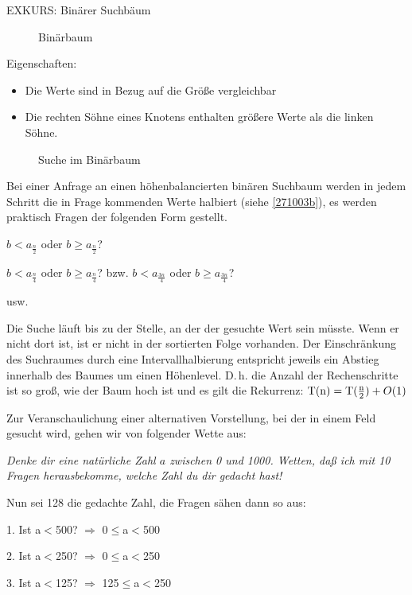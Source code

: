 \documentclass[ngerman,draft,parskip=half*,twoside]{scrreprt}
\theoremstyle{break}
\begin{document}
EXKURS: Binärer Suchbäum
\begin{figure}[H]
	\centering
	\caption{Binärbaum}
	\label{271003a}
\end{figure}

Eigenschaften:
\begin{itemize}
	\item Die Werte sind in Bezug auf die Größe vergleichbar
	\item Die rechten Söhne eines Knotens enthalten größere Werte als die linken Söhne.
\end{itemize}

\begin{figure}
	\centering
	\caption{Suche im Binärbaum}
	\label{271003b}
\end{figure}

Bei einer Anfrage an einen höhenbalancierten binären Suchbaum werden in jedem Schritt die in Frage kommenden Werte halbiert (siehe \autoref{271003b}), es
werden praktisch Fragen der folgenden Form gestellt.

 \quad \( b < a_{\frac{n}{2}} \) oder \( b \geq a_{\frac{n}{2}} \)?
 
 \quad \( b < a_{\frac{n}{4}} \) oder \( b \geq a_{\frac{n}{4}} \)? bzw. \( b < a_{\frac{3n}{4}} \) oder \( b \geq a_{\frac{3n}{4}} \)?

 \quad usw. 
 
Die Suche läuft bis zu der Stelle, an der der gesuchte Wert sein müsste. Wenn er nicht dort ist, ist er nicht in der sortierten Folge
vorhanden.
%
Der Einschränkung des Suchraumes durch eine Intervallhalbierung entspricht jeweils ein Abstieg innerhalb des Baumes um einen
Höhenlevel.
D.\,h. die Anzahl der Rechenschritte ist so groß, wie der Baum hoch ist und es gilt die Rekurrenz: 
\(\textup{T}(\textup{n})=\textup{T}(\frac{\textup{n}}{2}) + O(1)\)

Zur Veranschaulichung einer alternativen Vorstellung, bei der in einem Feld gesucht wird, gehen wir von folgender Wette aus:

\textit{Denke dir eine natürliche Zahl $a$ zwischen 0 und 1000. Wetten, daß ich mit 10 Fragen herausbekomme, welche Zahl du dir gedacht
hast!}

Nun sei 128 die gedachte Zahl, die Fragen sähen dann so aus:

1. Ist a$<$500? $\Rightarrow$ 0$\leq$a$<$500

2. Ist a$<$250? $\Rightarrow$ 0$\leq$a$<$250

3. Ist a$<$125? $\Rightarrow$ 125$\leq$a$<$250
\end{document}
